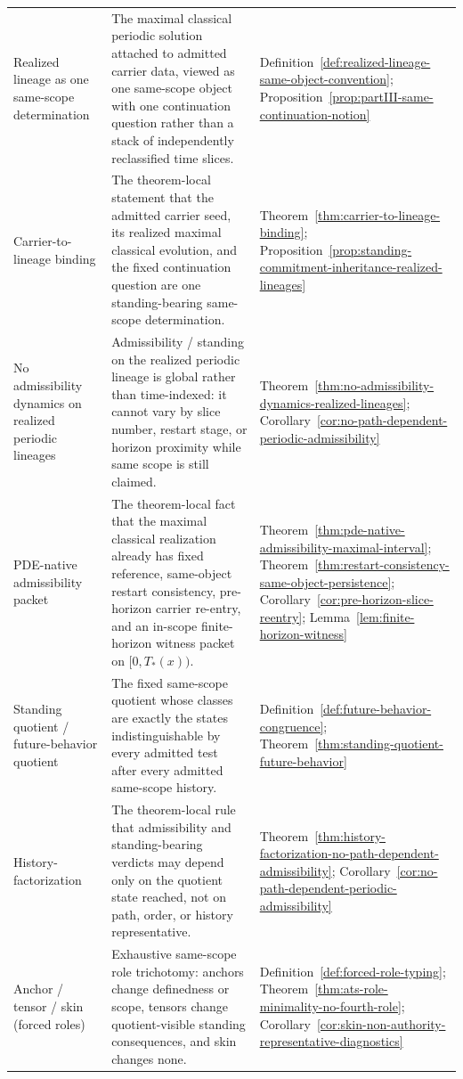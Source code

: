 \begin{tcolorbox}[title={Compact glossary and PDE-language crosswalk}, colback=green!2!white, colframe=green!45!black, boxsep=1pt, left=2pt, right=2pt, top=2pt, bottom=2pt]
\begin{tabularx}{\textwidth}{@{}L{0.22\textwidth}L{0.35\textwidth}Y@{}}
Realized lineage as one same-scope determination & The maximal classical periodic solution attached to admitted carrier data, viewed as one same-scope object with one continuation question rather than a stack of independently reclassified time slices. & Definition~\ref{def:realized-lineage-same-object-convention}; Proposition~\ref{prop:partIII-same-continuation-notion}\\
Carrier-to-lineage binding & The theorem-local statement that the admitted carrier seed, its realized maximal classical evolution, and the fixed continuation question are one standing-bearing same-scope determination. & Theorem~\ref{thm:carrier-to-lineage-binding}; Proposition~\ref{prop:standing-commitment-inheritance-realized-lineages}\\
No admissibility dynamics on realized periodic lineages & Admissibility / standing on the realized periodic lineage is global rather than time-indexed: it cannot vary by slice number, restart stage, or horizon proximity while same scope is still claimed. & Theorem~\ref{thm:no-admissibility-dynamics-realized-lineages}; Corollary~\ref{cor:no-path-dependent-periodic-admissibility}\\
PDE-native admissibility packet & The theorem-local fact that the maximal classical realization already has fixed reference, same-object restart consistency, pre-horizon carrier re-entry, and an in-scope finite-horizon witness packet on $[0,T_*(x))$. & Theorem~\ref{thm:pde-native-admissibility-maximal-interval}; Theorem~\ref{thm:restart-consistency-same-object-persistence}; Corollary~\ref{cor:pre-horizon-slice-reentry}; Lemma~\ref{lem:finite-horizon-witness}\\
Standing quotient / future-behavior quotient & The fixed same-scope quotient whose classes are exactly the states indistinguishable by every admitted test after every admitted same-scope history. & Definition~\ref{def:future-behavior-congruence}; Theorem~\ref{thm:standing-quotient-future-behavior}\\
History-factorization & The theorem-local rule that admissibility and standing-bearing verdicts may depend only on the quotient state reached, not on path, order, or history representative. & Theorem~\ref{thm:history-factorization-no-path-dependent-admissibility}; Corollary~\ref{cor:no-path-dependent-periodic-admissibility}\\
Anchor / tensor / skin (forced roles) & Exhaustive same-scope role trichotomy: anchors change definedness or scope, tensors change quotient-visible standing consequences, and skin changes none. & Definition~\ref{def:forced-role-typing}; Theorem~\ref{thm:ats-role-minimality-no-fourth-role}; Corollary~\ref{cor:skin-non-authority-representative-diagnostics}\\
\bottomrule
\end{tabularx}
\end{tcolorbox}

